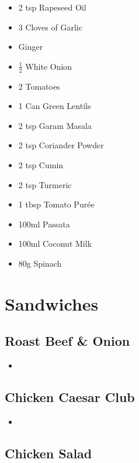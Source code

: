 \documentclass[11pt, english]{article}
\begin{document}
	\begin{itemize}
        \setlength\itemsep{0cm}
                \item 2 tsp Rapeseed Oil
		\item 3 Cloves of Garlic
		\item Ginger
		\item $\frac{1}{2}$ White Onion
		\item 2 Tomatoes
		\item 1 Can Green Lentils
		\item 2 tsp Garam Masala
		\item 2 tsp Coriander Powder
		\item 2 tsp Cumin
		\item 2 tsp Turmeric
		\item 1 tbsp Tomato Pur\'{e}e
		\item 100ml Passata
		\item 100ml Coconut Milk
		\item 80g Spinach
        \end{itemize}

\newpage

\section{Sandwiches}

	\subsection{Roast Beef \& Onion}

	\begin{itemize}
	\setlength\itemsep{0cm}
		\item 
	\end{itemize}

\newpage

	\subsection{Chicken Caesar Club}

	\begin{itemize}
	\setlength\itemsep{0cm}
		\item 
	\end{itemize}

\newpage

	\subsection{Chicken Salad}
\end{document}
